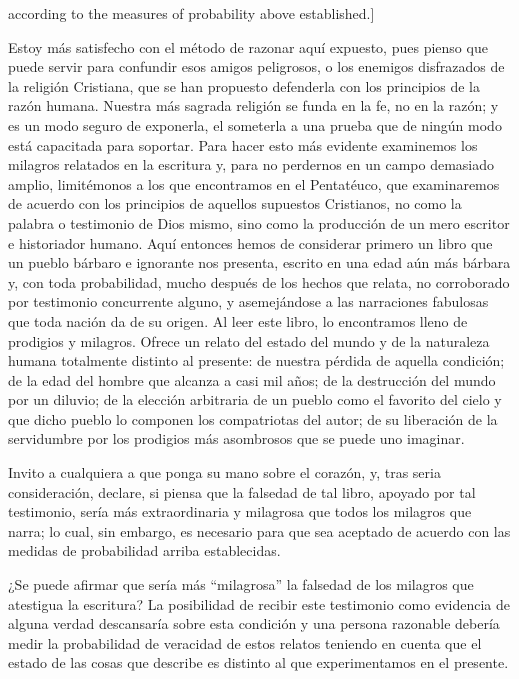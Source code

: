 according to the measures of probability above established.]{Estoy más
  satisfecho con el método de razonar aquí expuesto, pues pienso que puede
  servir para confundir esos amigos peligrosos, o los enemigos disfrazados de la
  religión Cristiana, que se han propuesto defenderla con los principios de la
  razón humana. Nuestra más sagrada religión se funda en la fe, no en la razón;
  y es un modo seguro de exponerla, el someterla a una prueba que de ningún modo
  está capacitada para soportar. Para hacer esto más evidente examinemos los
  milagros relatados en la escritura y, para no perdernos en un campo demasiado
  amplio, limitémonos a los que encontramos en el Pentatéuco, que examinaremos
  de acuerdo con los principios de aquellos supuestos Cristianos, no como la
  palabra o testimonio de Dios mismo, sino como la producción de un mero
  escritor e historiador humano. Aquí entonces hemos de considerar primero un
  libro que un pueblo bárbaro e ignorante nos presenta, escrito en una edad aún
  más bárbara y, con toda probabilidad, mucho después de los hechos que relata,
  no corroborado por testimonio concurrente alguno, y asemejándose a las
  narraciones fabulosas que toda nación da de su origen. Al leer este libro, lo
  encontramos lleno de prodigios y milagros. Ofrece un relato del estado del
  mundo y de la naturaleza humana totalmente distinto al presente: de nuestra
  pérdida de aquella condición; de la edad del hombre que alcanza a casi mil
  años; de la destrucción del mundo por un diluvio; de la elección arbitraria de
  un pueblo como el favorito del cielo y que dicho pueblo lo componen los
  compatriotas del autor; de su liberación de la servidumbre por los prodigios
  más asombrosos que se puede uno imaginar.

  Invito a cualquiera a que ponga su mano sobre el corazón, y, tras seria
  consideración, declare, si piensa que la falsedad de tal libro, apoyado por
  tal testimonio, sería más extraordinaria y milagrosa que todos los milagros
  que narra; lo cual, sin embargo, es necesario para que sea aceptado de acuerdo
  con las medidas de probabilidad arriba establecidas.}

¿Se puede afirmar que sería más \enquote{milagrosa} la falsedad de los milagros
que atestigua la escritura? La posibilidad de recibir este testimonio como
evidencia de alguna verdad descansaría sobre esta condición y una persona
razonable debería medir la probabilidad de veracidad de estos relatos teniendo
en cuenta que el estado de las cosas que describe es distinto al que
experimentamos en el presente.

